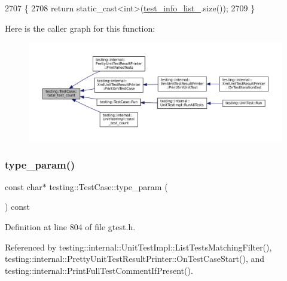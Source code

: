 \begin{DoxyCode}
2707                                      \{
2708   \textcolor{keywordflow}{return} \textcolor{keyword}{static\_cast<}\textcolor{keywordtype}{int}\textcolor{keyword}{>}(\hyperlink{classtesting_1_1TestCase_adce272a48399dd67a7bdd14fa7e99b80}{test\_info\_list\_}.size());
2709 \}
\end{DoxyCode}
Here is the caller graph for this function\+:
\nopagebreak
\begin{figure}[H]
\begin{center}
\leavevmode
\includegraphics[width=350pt]{classtesting_1_1TestCase_aba3cab19aaf7295284f0832f2cf895a3_icgraph}
\end{center}
\end{figure}
\mbox{\label{classtesting_1_1TestCase_a9df62c4104a4f856b477c9e8335bb689}} 
\subsubsection{\texorpdfstring{type\+\_\+param()}{type\_param()}}
{\footnotesize\ttfamily const char$\ast$ testing\+::\+Test\+Case\+::type\+\_\+param (\begin{DoxyParamCaption}{ }\end{DoxyParamCaption}) const\hspace{0.3cm}{\ttfamily [inline]}}



Definition at line 804 of file gtest.\+h.



Referenced by testing\+::internal\+::\+Unit\+Test\+Impl\+::\+List\+Tests\+Matching\+Filter(), testing\+::internal\+::\+Pretty\+Unit\+Test\+Result\+Printer\+::\+On\+Test\+Case\+Start(), and testing\+::internal\+::\+Print\+Full\+Test\+Comment\+If\+Present().


